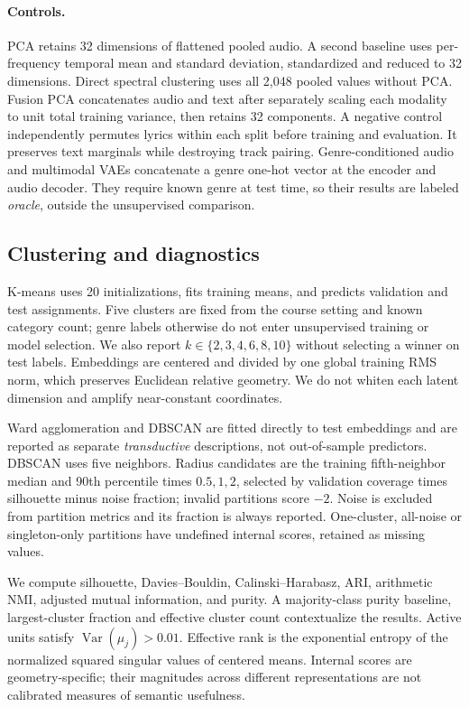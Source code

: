 \documentclass{article}
\begin{document}
\paragraph{Controls.}
PCA retains 32 dimensions of flattened pooled audio. A second baseline uses
per-frequency temporal mean and standard deviation, standardized and reduced
to 32 dimensions. Direct spectral clustering uses all 2,048 pooled values
without PCA. Fusion PCA concatenates audio and text after separately scaling
each modality to unit total training variance, then retains 32 components.
A negative control independently permutes lyrics within each split before
training and evaluation. It preserves text marginals while destroying track
pairing. Genre-conditioned audio and multimodal VAEs concatenate a genre
one-hot vector at the encoder and audio decoder. They require known genre at
test time, so their results are labeled \emph{oracle}, outside the unsupervised
comparison.

\subsection{Clustering and diagnostics}
K-means uses 20 initializations, fits training means, and predicts validation
and test assignments. Five clusters are fixed from the course setting and
known category count; genre labels otherwise do not enter unsupervised training
or model selection. We also report $k\in\{2,3,4,6,8,10\}$ without selecting a
winner on test labels. Embeddings are centered and divided by one global
training RMS norm, which preserves Euclidean relative geometry. We do not
whiten each latent dimension and amplify near-constant coordinates.

Ward agglomeration and DBSCAN are fitted directly to test embeddings and are
reported as separate \emph{transductive} descriptions, not out-of-sample
predictors. DBSCAN uses five neighbors. Radius candidates are the training
fifth-neighbor median and 90th percentile times $0.5,1,2$, selected by validation
coverage times silhouette minus noise fraction; invalid partitions score $-2$.
Noise is excluded from partition metrics and its fraction is always reported.
One-cluster, all-noise or singleton-only partitions have undefined internal
scores, retained as missing values.

We compute silhouette, Davies--Bouldin, Calinski--Harabasz, ARI, arithmetic NMI,
adjusted mutual information, and purity. A majority-class purity baseline,
largest-cluster fraction and effective cluster count contextualize the results.
Active units satisfy $\operatorname{Var}(\mu_j)>0.01$. Effective rank is the
exponential entropy of the normalized squared singular values of centered
means. Internal scores are geometry-specific; their magnitudes across different
representations are not calibrated measures of semantic usefulness.
\end{document}
